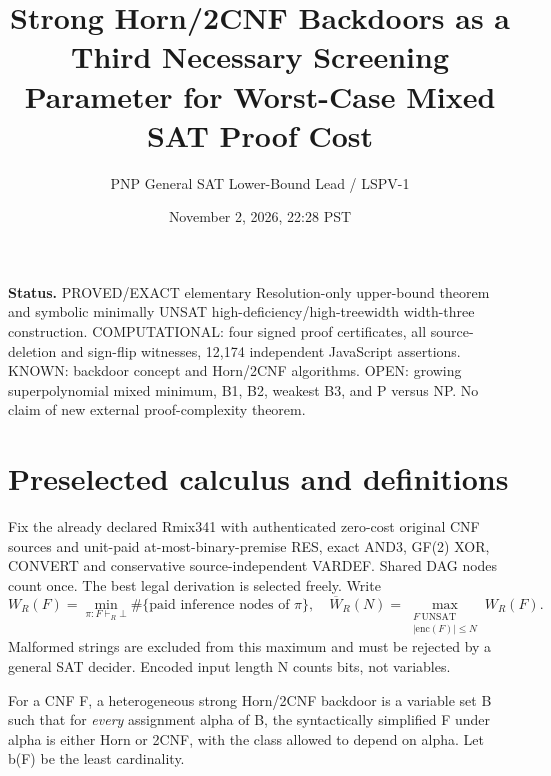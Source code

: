 \documentclass[11pt]{article}
\title{Strong Horn/2CNF Backdoors as a Third Necessary Screening Parameter for Worst-Case Mixed SAT Proof Cost}
\author{PNP General SAT Lower-Bound Lead / LSPV-1}
\date{November 2, 2026, 22:28 PST}
\begin{document}
\maketitle
\noindent\textbf{Status.} PROVED/EXACT elementary Resolution-only upper-bound theorem and symbolic minimally UNSAT high-deficiency/high-treewidth width-three construction. COMPUTATIONAL: four signed proof certificates, all source-deletion and sign-flip witnesses, 12,174 independent JavaScript assertions. KNOWN: backdoor concept and Horn/2CNF algorithms. OPEN: growing superpolynomial mixed minimum, B1, B2, weakest B3, and P versus NP. No claim of new external proof-complexity theorem.

\section*{Preselected calculus and definitions}
Fix the already declared Rmix341 with authenticated zero-cost original CNF sources and unit-paid at-most-binary-premise RES, exact AND3, GF(2) XOR, CONVERT and conservative source-independent VARDEF. Shared DAG nodes count once. The best legal derivation is selected freely. Write
\[
W_R(F)=\min_{\pi:F\vdash_R\bot}\#\{\text{paid inference nodes of }\pi\},\quad
\overline W_R(N)=\max_{\substack{F\ \mathrm{UNSAT}\\|\mathrm{enc}(F)|\le N}}W_R(F).
\]
Malformed strings are excluded from this maximum and must be rejected by a general SAT decider. Encoded input length N counts bits, not variables.

For a CNF F, a heterogeneous strong Horn/2CNF backdoor is a variable set B such that for \emph{every} assignment alpha of B, the syntactically simplified F under alpha is either Horn or 2CNF, with the class allowed to depend on alpha. Let b(F) be the least cardinality.
\end{document}
